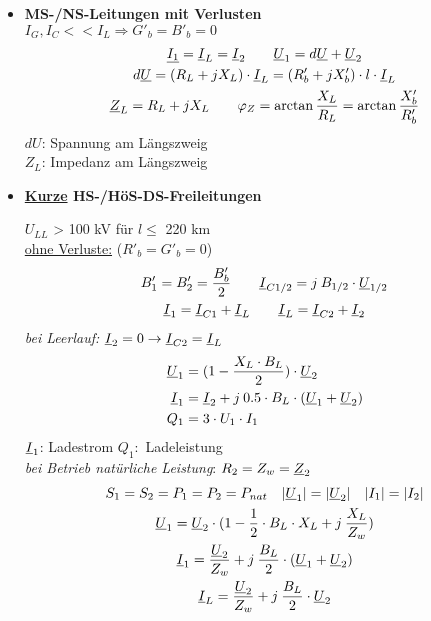 \begin{itemize}
\newpage
\item[] \textbf{MS-/NS-Leitungen mit Verlusten}\\
    $I_G, I_C<< I_L \Rightarrow G'_b = B'_b = 0$
        \begin{gather*}
            \underline{I_1} = \underline{I}_L = \underline{I}_2 \qquad
            \underline{U}_1 = d \underline{U} + \underline{U}_2\\
            d \underline{U} = (R_L + jX_L) \cdot \underline{I}_L = (R'_b +jX'_b) \cdot l \cdot \underline{I}_L\\
            \underline{Z}_L = R_L +jX_L \qquad \varphi_Z =\arctan \frac{X_L}{R_L} = \arctan \frac{X'_b}{R'_b}
        \end{gather*}
$dU$: Spannung am Längszweig\\
$Z_L$: Impedanz am Längszweig\\

\item[] \textbf{\ul{Kurze} HS-/HöS-DS-Freileitungen}

    $U_{LL}$ > 100 kV für $l\leq$ 220 km\\

    \ul{ohne Verluste:} ($R'_b = G'_b = 0$)
    \begin{gather*}
        B'_1 = B'_2 = \frac{B'_b}{2} \qquad
        \underline{I}_{C1/2} = j \: B_{1/2} \cdot \underline{U}_{1/2}\\
        \underline{I}_1 = \underline{I}_{C1} + \underline{I}_L \qquad  \underline{I}_L =  \underline{I}_{C2} +  \underline{I}_2
    \end{gather*}
    \textit{bei Leerlauf:} $\underline{I}_2 = 0 \rightarrow \underline{I}_{C2} = \underline{I}_L$
    \begin{align*}
        \underline{U}_1 &= (1 - \frac{X_L\cdot B_L}{2}) \cdot \underline{U}_2\\
        \underline{I}_1 &=  \underline{I}_2 + j \: 0.5 \cdot B_L \cdot ( \underline{U}_1 + \underline{U}_2)\\
        Q_1 &= 3\cdot U_1 \cdot I_1
    \end{align*}
    $\underline{I}_1$: Ladestrom \qquad
    $Q_1:$ Ladeleistung\\

    \textit{bei Betrieb natürliche Leistung}: $R_2 = Z_w = \underline{Z}_2$
        \begin{gather*}
            S_1 = S_2 = P_1 = P_2 = P_{nat} \quad
            |\underline{U}_1| = |\underline{U}_2| \quad |I_1| = |I_2|\\
            \underline{U}_1 = \underline{U}_2 \cdot(1-\frac{1}{2} \cdot B_L \cdot X_L + j\: \frac{X_L}{Z_w})\\
            \underline{I}_1=  \frac{\underline{U}_2}{Z_w}+j\: \frac{B_L}{2}\cdot (\underline{U}_1 + \underline{U}_2)\\
            \underline{I}_L=  \frac{\underline{U}_2}{Z_w}+j\: \frac{B_L}{2}\cdot \underline{U}_2\\
        \end{gather*}


\end{itemize}
